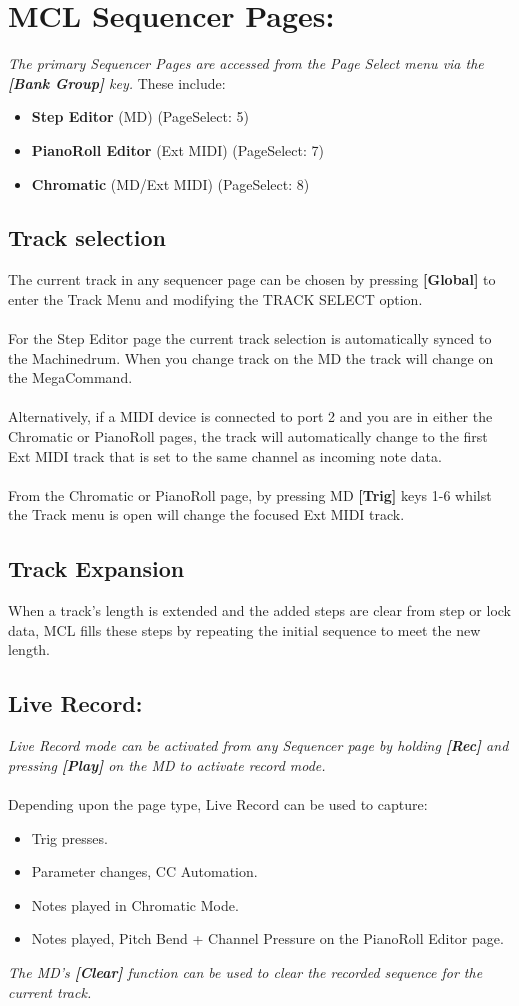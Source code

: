 \chapter{MCL Sequencer Pages:}

\textit{The primary Sequencer Pages are accessed from the Page Select menu via the \textbf{[Bank Group]} key.} These include:
\begin{itemize}
    \item \textbf{Step Editor} (MD) (PageSelect: 5)
    \item \textbf{PianoRoll Editor} (Ext MIDI) (PageSelect: 7)
    \item \textbf{Chromatic} (MD/Ext MIDI) (PageSelect: 8)
\end{itemize}
\section{Track selection}
The current track in any sequencer page can be chosen by pressing \textbf{[Global]} to enter the Track Menu and modifying the TRACK SELECT option.
\\\\
For the Step Editor page the current track selection is automatically synced to the Machinedrum. When you change track on the MD the track will change on the MegaCommand.\\\\
Alternatively, if a MIDI device is connected to port 2 and you are in either the Chromatic or PianoRoll pages, the track will automatically change to the first Ext MIDI track that is set to the same channel as incoming note data.\\\\
From the Chromatic or PianoRoll page, by pressing MD \textbf{[Trig]} keys 1-6 whilst the Track menu is open will change the focused Ext MIDI track.
\section{Track Expansion}
When a track's length is extended and the added steps are clear from step or lock data, MCL fills these steps by repeating the initial sequence to meet the new length.
\section{Live Record:}
\textit{Live Record mode can be activated from any Sequencer page by holding \textbf{[Rec]} and pressing \textbf{[Play]} on the MD to activate record mode.}\\\\Depending upon the page type, Live Record can be used to capture:
\begin{itemize}
    \item Trig presses.
    \item Parameter changes, CC Automation.
    \item Notes played in Chromatic Mode.
    \item Notes played, Pitch Bend + Channel Pressure on the PianoRoll Editor page.
\end{itemize}
\textit{The MD's \textbf{[Clear]} function can be used to clear the recorded sequence for the current track.}
\newpage
